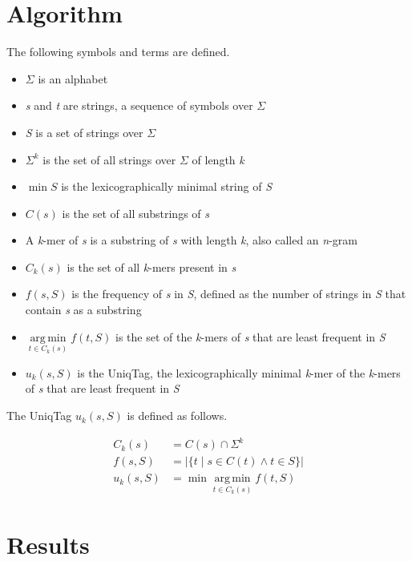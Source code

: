 \documentclass{bioinfo}
\begin{document}
\section{Algorithm}\label{algorithm}

The following symbols and terms are defined.

\begin{itemize}
\itemsep1pt\parskip0pt
\item
  $\Sigma$ is an alphabet
\item
  \emph{s} and \emph{t} are strings, a sequence of symbols over $\Sigma$
\item
  \emph{S} is a set of strings over $\Sigma$
\item
  $\Sigma^k$ is the set of all strings over $\Sigma$ of length \emph{k}
\item
  $\min S$ is the lexicographically minimal string of \emph{S}
\item
  $C(s)$ is the set of all substrings of \emph{s}
\item
  A \emph{k}-mer of \emph{s} is a substring of \emph{s} with length
  \emph{k}, also called an \emph{n}-gram
\item
  $C_k(s)$ is the set of all \emph{k}-mers present in \emph{s}
\item
  $f(s, S)$ is the frequency of \emph{s} in \emph{S}, defined as the
  number of strings in \emph{S} that contain \emph{s} as a substring
\item
  $\mathop{\arg\,\min}\limits_{t \in C_k(s)} f(t, S)$ is the set of the
  \emph{k}-mers of \emph{s} that are least frequent in \emph{S}
\item
  $u_k(s, S)$ is the UniqTag, the lexicographically minimal \emph{k}-mer
  of the \emph{k}-mers of \emph{s} that are least frequent in \emph{S}
\end{itemize}

\clearpage
The UniqTag $u_k(s, S)$ is defined as follows.

\[
\begin{aligned}
C_k(s) &= C(s) \cap \Sigma^k
\\ f(s, S) &= \left\vert \{ t \mid s \in C(t) \wedge t \in S \} \right\vert
\\ u_k(s, S) &= \min \mathop{\arg\,\min}\limits_{t \in C_k(s)} f(t, S)
\end{aligned}
\]

\section{Results}\label{results}
\end{document}
